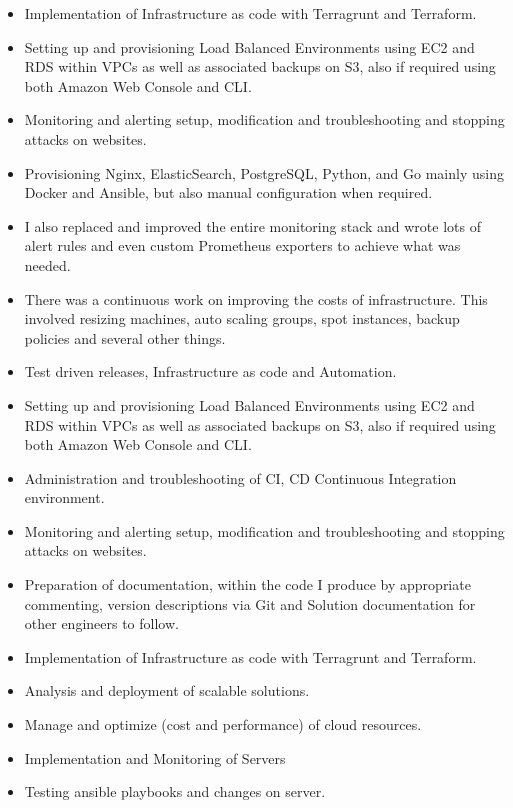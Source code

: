 \divider

\begin{itemize}
    \item Implementation of Infrastructure as code with Terragrunt and Terraform.
    \item Setting up and provisioning Load Balanced Environments using EC2 and RDS within VPCs as well as associated backups on S3, also if required using both Amazon Web Console and CLI.
    \item Monitoring and alerting setup, modification and troubleshooting and stopping attacks on websites.
    \item Provisioning Nginx, ElasticSearch, PostgreSQL, Python, and Go mainly using Docker and Ansible, but also manual configuration when required.
\end{itemize}

\divider

\begin{itemize}
    \item I also replaced and improved the entire monitoring stack and wrote lots of alert rules and even custom Prometheus exporters to achieve what was needed.
    \item There was a continuous work on improving the costs of infrastructure. This involved resizing machines, auto scaling groups, spot instances, backup policies and several other things.
    \item Test driven releases, Infrastructure as code and Automation.
    \item Setting up and provisioning Load Balanced Environments using EC2 and RDS within VPCs as well as associated backups on S3, also if required using both Amazon Web Console and CLI.
    \item Administration and troubleshooting of CI, CD Continuous Integration environment.
    \item Monitoring and alerting setup, modification and troubleshooting and stopping attacks on websites.
    \item Preparation of documentation, within the code I produce by appropriate commenting, version descriptions via Git and Solution documentation for other engineers to follow.
\end{itemize}

\divider

\begin{itemize}
    \item Implementation of Infrastructure as code with Terragrunt and Terraform.
    \item Analysis and deployment of scalable solutions.
    \item Manage and optimize (cost and performance) of cloud resources.
    \item Implementation and Monitoring of Servers
    \item Testing ansible playbooks and changes on server.
\end{itemize}


